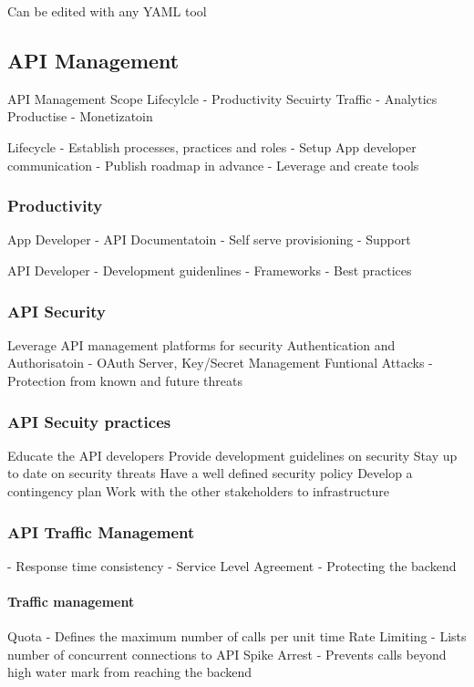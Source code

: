 \documentclass[a4paper, 11pt]{book}
\begin{document}
    Can be edited with any YAML tool

    \subsection{API Management}

    API Management Scope
    Lifecylcle - Productivity
    Secuirty
    Traffic - Analytics
    Productise - Monetizatoin


    Lifecycle
    - Establish processes, practices and roles
    - Setup App developer communication
    - Publish roadmap in advance
    - Leverage and create tools

    \subsubsection{Productivity}
    App Developer
    - API Documentatoin
    - Self serve provisioning
    - Support

    API Developer
    - Development guidenlines
    - Frameworks
    - Best practices

    \subsubsection{API Security}
    Leverage API management platforms for security
    Authentication and Authorisatoin - OAuth Server, Key/Secret Management
    Funtional Attacks - Protection from known and future threats


    \subsubsection{API Secuity practices}
    Educate the API developers
    Provide development guidelines on security
    Stay up to date on security threats
    Have a well defined security policy
    Develop a contingency plan
    Work with the other stakeholders to infrastructure

    \subsubsection{API Traffic Management}
    - Response time consistency
    - Service Level Agreement
    - Protecting the backend

    \paragraph{Traffic management}
    Quota - Defines the maximum number of calls per unit time
    Rate Limiting - Lists number of concurrent connections to API
    Spike Arrest - Prevents calls beyond high water mark from reaching the backend %
\end{document}
